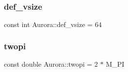 \subsubsection{\texorpdfstring{def\+\_\+vsize}{def\_vsize}}
{\footnotesize\ttfamily const int Aurora\+::def\+\_\+vsize = 64}

\mbox{\label{namespace_aurora_a4c08f8416c2b35d5001062f121459b5a}} 
\subsubsection{\texorpdfstring{twopi}{twopi}}
{\footnotesize\ttfamily const double Aurora\+::twopi = 2 $\ast$ M\+\_\+\+PI}

